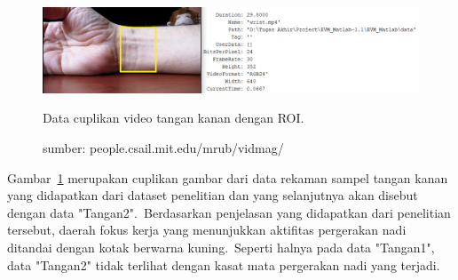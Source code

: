 \begin{figure}[ht]
	\vspace{0.5em}
	\centering
	\includegraphics[width=\textwidth]{tangan2_roi}
	\caption{Data cuplikan video tangan kanan dengan ROI.}
	\caption*{sumber: people.csail.mit.edu/mrub/vidmag/}
	\label{fig:tangan2}   
\end{figure}
 Gambar~\ref{fig:tangan2} merupakan cuplikan gambar dari data rekaman sampel tangan kanan yang didapatkan dari dataset penelitian \citet{Wu2012} dan \citet{RubinsteinPhDThesis2014} yang selanjutnya akan disebut dengan data "Tangan2".~Berdasarkan penjelasan yang didapatkan dari penelitian tersebut, daerah fokus kerja yang menunjukkan aktifitas pergerakan nadi ditandai dengan kotak berwarna kuning.~Seperti halnya pada data "Tangan1", data "Tangan2" tidak terlihat dengan kasat mata pergerakan nadi yang terjadi.

